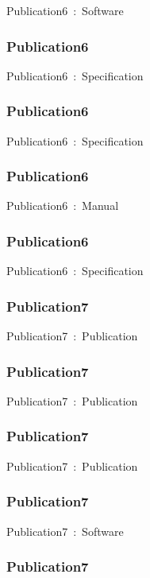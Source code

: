 \documentclass{article}
\begin{document}
Publication6~:~Software

\subsubsection*{Publication6}

Publication6~:~Specification

\subsubsection*{Publication6}

Publication6~:~Specification

\subsubsection*{Publication6}

Publication6~:~Manual

\subsubsection*{Publication6}

Publication6~:~Specification

\subsubsection*{Publication7}

Publication7~:~Publication

\subsubsection*{Publication7}

Publication7~:~Publication

\subsubsection*{Publication7}

Publication7~:~Publication

\subsubsection*{Publication7}

Publication7~:~Software

\subsubsection*{Publication7}
\end{document}
